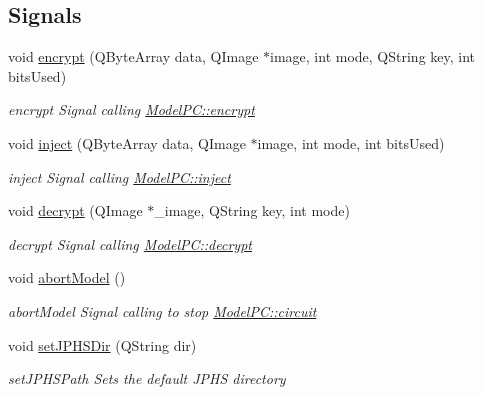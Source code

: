 \subsection*{Signals}
\begin{DoxyCompactItemize}
\item 
void \hyperlink{class_view_p_c_aaab3c809a069aed248ef7100daabf8ee}{encrypt} (Q\+Byte\+Array data, Q\+Image $\ast$image, int mode, Q\+String key, int bits\+Used)
\begin{DoxyCompactList}\small\item\em encrypt Signal calling \hyperlink{class_model_p_c_a6f191f62d4635d0d3555fcc0be298794}{Model\+P\+C\+::encrypt} \end{DoxyCompactList}\item 
void \hyperlink{class_view_p_c_a652c98014c2df32178d43a5a9612dd99}{inject} (Q\+Byte\+Array data, Q\+Image $\ast$image, int mode, int bits\+Used)
\begin{DoxyCompactList}\small\item\em inject Signal calling \hyperlink{class_model_p_c_aada6a04d81ada8f2b4ba18108c8d6f10}{Model\+P\+C\+::inject} \end{DoxyCompactList}\item 
void \hyperlink{class_view_p_c_a365df051360d557c7221474ad856e0af}{decrypt} (Q\+Image $\ast$\+\_\+image, Q\+String key, int mode)
\begin{DoxyCompactList}\small\item\em decrypt Signal calling \hyperlink{class_model_p_c_a69ea58f4455f8536c4be1d3f44424a60}{Model\+P\+C\+::decrypt} \end{DoxyCompactList}\item 
void \hyperlink{class_view_p_c_aa652102ce6b5757b8eef830409c8cabf}{abort\+Model} ()
\begin{DoxyCompactList}\small\item\em abort\+Model Signal calling to stop \hyperlink{class_model_p_c_a1d0091062a0c836b283ec2f67411623b}{Model\+P\+C\+::circuit} \end{DoxyCompactList}\item 
void \hyperlink{class_view_p_c_ae81085836c0c01bc9556a5b27eb8d19c}{set\+J\+P\+H\+S\+Dir} (Q\+String dir)
\begin{DoxyCompactList}\small\item\em set\+J\+P\+H\+S\+Path Sets the default J\+P\+HS directory \end{DoxyCompactList}\end{DoxyCompactItemize}
